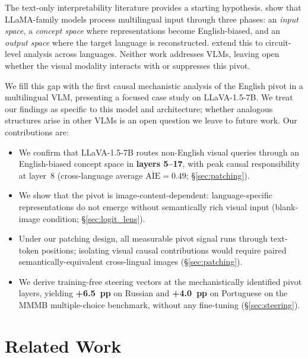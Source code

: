 \documentclass[11pt]{article}
\begin{document}
The text-only interpretability literature provides a starting hypothesis.
\citet{wendler-etal-2024-llamas} show that LLaMA-family models process
multilingual input through three phases: an \emph{input space}, a
\emph{concept space} where representations become English-biased, and an
\emph{output space} where the target language is reconstructed.
\citet{ferrando-costa-jussa-2024-similarity} extend this to circuit-level
analysis across languages.
Neither work addresses VLMs, leaving open whether the visual modality interacts
with or suppresses this pivot.

We fill this gap with the first causal mechanistic analysis of the English
pivot in a multilingual VLM, presenting a focused case study on LLaVA-1.5-7B.
We treat our findings as specific to this model and architecture; whether
analogous structures arise in other VLMs is an open question we leave to
future work.
Our contributions are:

\begin{itemize}[noitemsep,topsep=2pt]
\item We confirm that LLaVA-1.5-7B routes non-English visual queries through
  an English-biased concept space in \textbf{layers 5--17}, with peak causal
  responsibility at layer~8 (cross-language average $\overline{\mathrm{AIE}}{=}0.49$; \S\ref{sec:patching}).
\item We show that the pivot is image-content-dependent: language-specific
  representations do not emerge without semantically rich visual input
  (blank-image condition; \S\ref{sec:logit_lens}).
\item Under our patching design, all measurable pivot signal runs through
  text-token positions; isolating visual causal contributions would require
  paired semantically-equivalent cross-lingual images (\S\ref{sec:patching}).
\item We derive training-free steering vectors at the mechanistically
  identified pivot layers, yielding \textbf{+6.5~pp} on Russian and
  \textbf{+4.0~pp} on Portuguese on the MMMB multiple-choice benchmark,
  without any fine-tuning (\S\ref{sec:steering}).
\end{itemize}

\section{Related Work}
\end{document}
